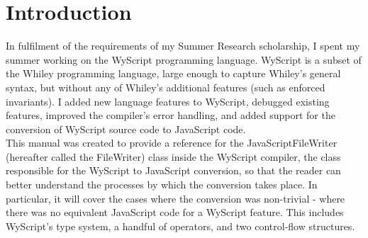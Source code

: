 \chapter{Introduction}
In fulfilment of the requirements of my Summer Research scholarship, I spent my summer working on the WyScript programming language. WyScript is a subset of the Whiley programming language, large enough to capture Whiley's general syntax, but without any of Whiley's additional features (such as enforced invariants). I added new language features to WyScript, debugged existing features, improved the compiler's error handling, and added support for the conversion of WyScript source code to JavaScript code.\\

This manual was created to provide a reference for the JavaScriptFileWriter (hereafter called the FileWriter) class inside the WyScript compiler, the class responsible for the WyScript to JavaScript conversion, so that the reader can better understand the processes by which the conversion takes place. In particular, it will cover the cases where the conversion was non-trivial - where there was no equivalent JavaScript code for a WyScript feature. This includes WyScript's type system, a handful of operators, and two control-flow structures.
